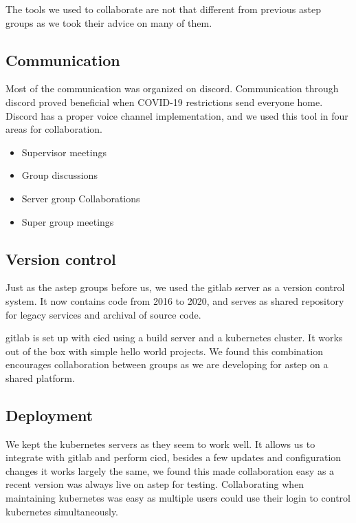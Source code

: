 \FloatBarrier
{}
The tools we used to collaborate are not that different from previous \gls{astep} groups as we took their advice on many of them.

\subsection*{Communication}
Most of the communication was organized on discord. Communication through discord proved beneficial when COVID-19 restrictions send everyone home. Discord has a proper voice channel implementation, and we used this tool in four areas for collaboration.
 
\begin{itemize}
     \item Supervisor meetings
     \item Group discussions
     \item Server group Collaborations
     \item Super group meetings
\end{itemize}

\subsection*{Version control}
Just as the \gls{astep} groups before us, we used the \gls{gitlab} server as a version control system. It now contains code from 2016 to 2020, and serves as shared repository for legacy services and archival of source code.

\Gls{gitlab} is set up with \gls{cicd} using a build server and a \gls{kubernetes} cluster. It works out of the box with simple hello world projects. We found this combination encourages collaboration between groups as we are developing for \gls{astep} on a shared platform.

\subsection*{Deployment}
We kept the \gls{kubernetes} servers as they seem to work well. It allows us to integrate with \gls{gitlab} and perform \gls{cicd}, besides a few updates and configuration changes it works largely the same, we found this made collaboration easy as a recent version was always live on \gls{astep} for testing. Collaborating when maintaining \gls{kubernetes} was easy as multiple users could use their login to control \gls{kubernetes} simultaneously.
